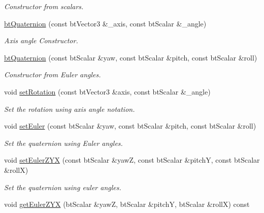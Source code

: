 \begin{CompactItemize}
\begin{CompactList}\small\item\em Constructor from scalars. \item\end{CompactList}\item 
\hyperlink{classbt_quaternion_2b2e9ed0014eb26ed076808fb76e9d69}{btQuaternion} (const btVector3 \&\_\-axis, const btScalar \&\_\-angle)
\begin{CompactList}\small\item\em Axis angle Constructor. \item\end{CompactList}\item 
\hyperlink{classbt_quaternion_8bd5d699377ba585749d325076616ffb}{btQuaternion} (const btScalar \&yaw, const btScalar \&pitch, const btScalar \&roll)
\begin{CompactList}\small\item\em Constructor from Euler angles. \item\end{CompactList}\item 
void \hyperlink{classbt_quaternion_de840b704d06ad0092b996b432b8a8a6}{setRotation} (const btVector3 \&axis, const btScalar \&\_\-angle)
\begin{CompactList}\small\item\em Set the rotation using axis angle notation. \item\end{CompactList}\item 
void \hyperlink{classbt_quaternion_ed0a6469d6c6c1e379f1143ad62b3439}{setEuler} (const btScalar \&yaw, const btScalar \&pitch, const btScalar \&roll)
\begin{CompactList}\small\item\em Set the quaternion using Euler angles. \item\end{CompactList}\item 
void \hyperlink{classbt_quaternion_df15384cff65f630b0537f1b8aeee622}{setEulerZYX} (const btScalar \&yawZ, const btScalar \&pitchY, const btScalar \&rollX)
\begin{CompactList}\small\item\em Set the quaternion using euler angles. \item\end{CompactList}\item 
void \hyperlink{classbt_quaternion_9aef6f3c621a0a8493d1545c7043f075}{getEulerZYX} (btScalar \&yawZ, btScalar \&pitchY, btScalar \&rollX) const 

\end{CompactItemize}
